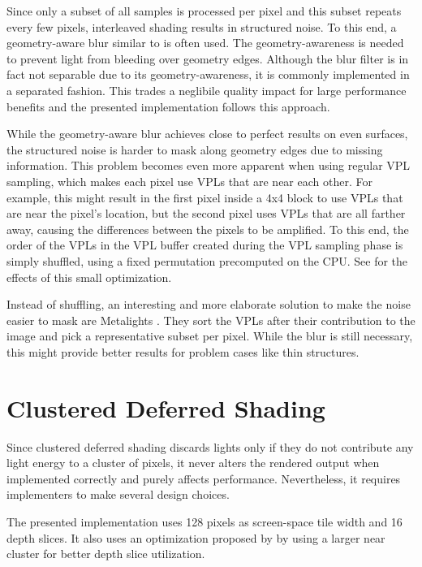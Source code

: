 Since only a subset of all samples is processed per pixel and this subset repeats every few pixels, interleaved shading results in structured noise. To this end, a geometry-aware blur similar to \citet{laine2007incremental} is often used. The geometry-awareness is needed to prevent light from bleeding over geometry edges. Although the blur filter is in fact not separable due to its geometry-awareness, it is commonly implemented in a separated fashion. This trades a neglibile quality impact for large performance benefits and the presented implementation follows this approach.


While the geometry-aware blur achieves close to perfect results on even surfaces, the structured noise is harder to mask along geometry edges due to missing information. This problem becomes even more apparent when using regular VPL sampling, which makes each pixel use VPLs that are near each other. For example, this might result in the first pixel inside a 4x4 block to use VPLs that are near the pixel's location, but the second pixel uses VPLs that are all farther away, causing the differences between the pixels to be amplified. To this end, the order of the VPLs in the VPL buffer created during the VPL sampling phase is simply shuffled, using a fixed permutation precomputed on the CPU. See  for the effects of this small optimization.

Instead of shuffling, an interesting and more elaborate solution to make the noise easier to mask are Metalights \citep{Faure:2010:Metalights}. They sort the VPLs after their contribution to the image and pick a representative subset per pixel. While the blur is still necessary, this might provide better results for problem cases like thin structures.


\section{Clustered Deferred Shading}
\label{sec:impl:clusteredShading}

Since clustered deferred shading discards lights only if they do not contribute any light energy to a cluster of pixels, it never alters the rendered output when implemented correctly and purely affects performance. Nevertheless, it requires implementers to make several design choices.

The presented implementation uses 128 pixels as screen-space tile width and 16 depth slices. It also uses an optimization proposed by \citet{persson::2013::practical} by using a larger near cluster for better depth slice utilization.

